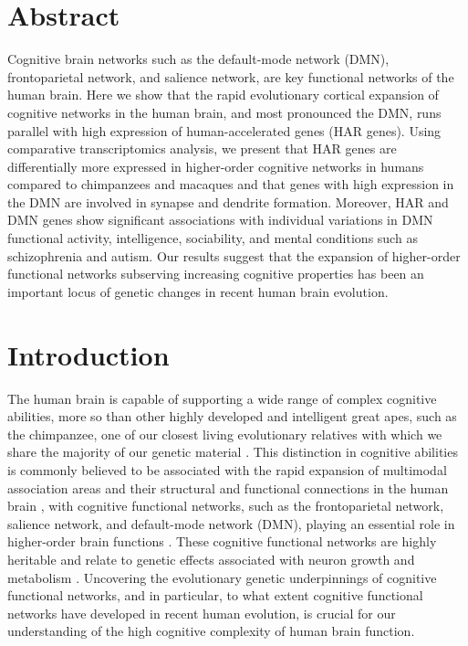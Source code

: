 \begin{refsection}
\newpage
\section*{Abstract}
Cognitive brain networks such as the default-mode network (DMN), frontoparietal network, and salience network, are key functional networks of the human brain. Here we show that the rapid evolutionary cortical expansion of cognitive networks in the human brain, and most pronounced the DMN, runs parallel with high expression of human-accelerated genes (HAR genes). Using comparative transcriptomics analysis, we present that HAR genes are differentially more expressed in higher-order cognitive networks in humans compared to chimpanzees and macaques and that genes with high expression in the DMN are involved in synapse and dendrite formation. Moreover, HAR and DMN genes show significant associations with individual variations in DMN functional activity, intelligence, sociability, and mental conditions such as schizophrenia and autism. Our results suggest that the expansion of higher-order functional networks subserving increasing cognitive properties has been an important locus of genetic changes in recent human brain evolution.

\section*{Introduction}
The human brain is capable of supporting a wide range of complex cognitive abilities, more so than other highly developed and intelligent great apes, such as the chimpanzee, one of our closest living evolutionary relatives with which we share the majority of our genetic material \citep{britten2002divergence}. This distinction in cognitive abilities is commonly believed to be associated with the rapid expansion of multimodal association areas and their structural and functional connections in the human brain \citep{buckner2013evolution,preuss2017chapter,ardesch2019evolutionary}, with cognitive functional networks, such as the frontoparietal network, salience network, and default-mode network (DMN), playing an essential role in higher-order brain functions \citep{buckner2008brain,raichle2015brain,uddin2015salience}. These cognitive functional networks are highly heritable \citep{glahn2010genetic,ge2017heritability} and relate to genetic effects associated with neuron growth and metabolism \citep{wang2015correspondence}. Uncovering the evolutionary genetic underpinnings of cognitive functional networks, and in particular, to what extent cognitive functional networks have developed in recent human evolution, is crucial for our understanding of the high cognitive complexity of human brain function.


\end{refsection}
